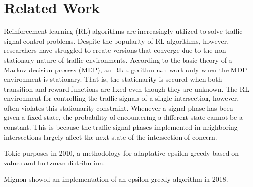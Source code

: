 
\section{Related Work}
\label{sec:related}


Reinforcement-learning (RL) algorithms are increasingly utilized to solve traffic signal control
problems. Despite the popularity of RL algorithms, however, researchers have struggled to create versions
that converge due to the non-stationary nature of traffic environments. According to the basic theory of a
Markov decision process (MDP), an RL algorithm can work only when the MDP environment is stationary.
That is, the stationarity is secured when both transition and reward functions are fixed even though they are
unknown. The RL environment for controlling the traffic signals of a single intersection, however, often
violates this stationarity constraint. Whenever a signal phase has been given a fixed state, the probability of
encountering a different state cannot be a constant. This is because the traffic signal phases implemented in
neighboring intersections largely affect the next state of the intersection of concern.\cite{meta-rl-traffic}

Tokic purposes in 2010, a methodology for adaptative epsilon greedy based on values and boltzman distribution.~\cite{tokic2010}

Mignon showed an implementation of an epsilon greedy algorithm in 2018.~\cite{mignon2017adaptive}



\endinput

